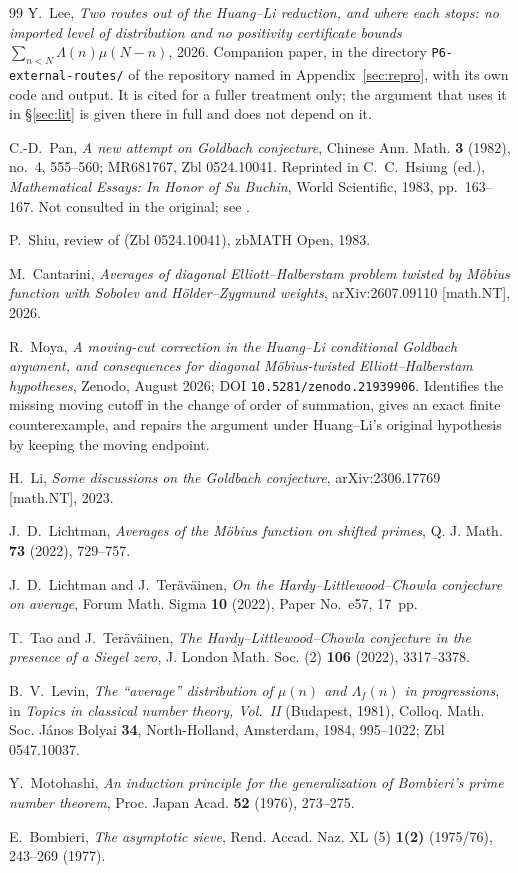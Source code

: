 \documentclass[11pt,a4paper]{article}
\theoremstyle{plain}
\theoremstyle{definition}
\theoremstyle{remark}
\begin{document}
\begin{thebibliography}{99}
 Y.~Lee, \emph{Two routes out of the Huang--Li reduction,
and where each stops: no imported level of distribution and no
positivity certificate bounds $\sum_{n<N}\Lambda(n)\mu(N-n)$}, 2026.
Companion paper, in the directory
\texttt{P6-external-routes/} of the repository named in
Appendix~\ref{sec:repro}, with its own code and output. It is cited
for a fuller treatment only; the argument that uses it in
\S\ref{sec:lit} is given there in full and does not depend on it.

 C.-D.~Pan, \emph{A new attempt on Goldbach conjecture},
Chinese Ann. Math. \textbf{3} (1982), no.~4, 555--560; MR681767,
Zbl 0524.10041. Reprinted in C.~C.~Hsiung (ed.), \emph{Mathematical
Essays: In Honor of Su Buchin}, World Scientific, 1983, pp.~163--167.
Not consulted in the original; see \cite{Shiu}.

 P.~Shiu, review of \cite{Pan} (Zbl 0524.10041),
zbMATH Open, 1983.

 M.~Cantarini, \emph{Averages of diagonal
Elliott--Halberstam problem twisted by M\"obius function with Sobolev
and H\"older--Zygmund weights}, arXiv:2607.09110 [math.NT], 2026.

 R.~Moya, \emph{A moving-cut correction in the
Huang--Li conditional Goldbach argument, and consequences for diagonal
M\"obius-twisted Elliott--Halberstam hypotheses}, Zenodo, August 2026;
DOI \texttt{10.5281/zenodo.21939906}. Identifies the missing moving
cutoff in the change of order of summation, gives an exact finite
counterexample, and repairs the argument under Huang--Li's original
hypothesis by keeping the moving endpoint.

 H.~Li, \emph{Some discussions on the Goldbach
conjecture}, arXiv:2306.17769 [math.NT], 2023.

 J.~D.~Lichtman, \emph{Averages of the M\"obius function
on shifted primes}, Q. J. Math. \textbf{73} (2022), 729--757.

 J.~D.~Lichtman and J.~Ter\"av\"ainen, \emph{On the
Hardy--Littlewood--Chowla conjecture on average}, Forum Math. Sigma
\textbf{10} (2022), Paper No.~e57, 17~pp.

 T.~Tao and J.~Ter\"av\"ainen, \emph{The
Hardy--Littlewood--Chowla conjecture in the presence of a Siegel
zero}, J. London Math. Soc. (2) \textbf{106} (2022), 3317--3378.

 B.~V.~Levin, \emph{The ``average'' distribution of
$\mu(n)$ and $\Lambda_f(n)$ in progressions}, in \emph{Topics in
classical number theory, Vol.~II} (Budapest, 1981), Colloq. Math. Soc.
J\'anos Bolyai \textbf{34}, North-Holland, Amsterdam, 1984,
995--1022; Zbl 0547.10037.

 Y.~Motohashi, \emph{An induction principle for the
generalization of Bombieri's prime number theorem}, Proc. Japan Acad.
\textbf{52} (1976), 273--275.

 E.~Bombieri, \emph{The asymptotic sieve},
Rend. Accad. Naz. XL (5) \textbf{1(2)} (1975/76), 243--269 (1977).

\end{thebibliography}
\end{document}
